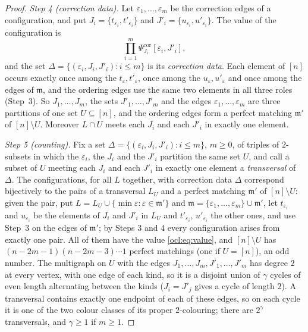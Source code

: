 \begin{proof}
\emph{Step 4 (correction data).} Let $\varepsilon_1,\dots,\varepsilon_m$ be the correction edges of a configuration, and
put $J_i=\{t_{\varepsilon_i},t'_{\varepsilon_i}\}$ and $J'_i=\{u_{\varepsilon_i},u'_{\varepsilon_i}\}$. The value of the
configuration is
\begin{equation}\label{ocl:eq:value}
\prod_{i=1}^m\Psi^{\mathrm{cor}}_{J_i}[\varepsilon_i,J'_i],
\end{equation}
and the set $\Delta=\{(\varepsilon_i,J_i,J'_i):i\le m\}$ is its \emph{correction data}. Each element of $[n]$ occurs
exactly once among the $t_\varepsilon,t'_\varepsilon$, once among the $u_\varepsilon,u'_\varepsilon$ and once among the
edges of $\mathfrak m$, and the ordering edges use the same two elements in all three roles (Step~3). So
$J_1,\dots,J_m$, the sets $J'_1,\dots,J'_m$ and the edges $\varepsilon_1,\dots,\varepsilon_m$ are three partitions of one
set $U\subseteq[n]$, and the ordering edges form a perfect matching $\mathfrak m'$ of $[n]\setminus U$. Moreover
$L\cap U$ meets each $J_i$ and each $J'_i$ in exactly one element.

\emph{Step 5 (counting).} Fix a set $\Delta=\{(\varepsilon_i,J_i,J'_i):i\le m\}$, $m\ge0$, of triples of $2$-subsets in
which the $\varepsilon_i$, the $J_i$ and the $J'_i$ partition the same set $U$, and call a subset of $U$ meeting each
$J_i$ and each $J'_i$ in exactly one element a \emph{transversal} of $\Delta$. The configurations, for all $L$
together, with correction data $\Delta$ correspond bijectively to the pairs of a transversal $L_U$ and a perfect
matching $\mathfrak m'$ of $[n]\setminus U$: given the pair, put $L=L_U\cup\{\min\varepsilon:\varepsilon\in\mathfrak m'\}$
and $\mathfrak m=\{\varepsilon_1,\dots,\varepsilon_m\}\cup\mathfrak m'$, let $t_{\varepsilon_i}$ and $u_{\varepsilon_i}$
be the elements of $J_i$ and $J'_i$ in $L_U$ and $t'_{\varepsilon_i}$, $u'_{\varepsilon_i}$ the other ones, and use
Step~3 on the edges of $\mathfrak m'$; by Steps 3 and 4 every configuration arises from exactly one pair. All of them
have the value \eqref{ocl:eq:value}, and $[n]\setminus U$ has $(n-2m-1)(n-2m-3)\cdots1$ perfect matchings (one if
$U=[n]$), an odd number. The multigraph on $U$ with the edges $J_1,\dots,J_m,J'_1,\dots,J'_m$ has degree $2$ at every
vertex, with one edge of each kind, so it is a disjoint union of $\gamma$ cycles of even length alternating between the
kinds ($J_i=J'_j$ gives a cycle of length $2$). A transversal contains exactly one endpoint of each of these edges, so
on each cycle it is one of the two colour classes of its proper $2$-colouring; there are $2^\gamma$ transversals, and
$\gamma\ge1$ if $m\ge1$.


\end{proof}
